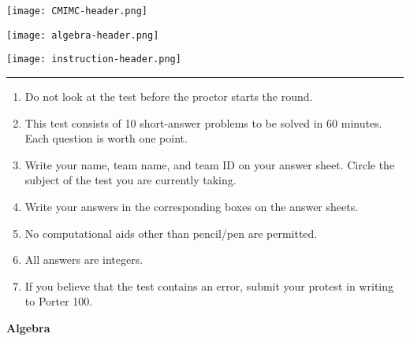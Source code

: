 \documentclass[10pt]{article}
\begin{document}
\thispagestyle{empty}
\begin{center}

\vspace*{90pt}

\texttt{[image: CMIMC-header.png]}

\texttt{[image: algebra-header.png]}

\vspace{1.6in}

\texttt{[image: instruction-header.png]}
\noindent\rule{17.7cm}{2pt}
\end{center}

\vspace{10pt}

\begin{enumerate}
\large
\item Do not look at the test before the proctor starts the round.

\item This test consists of 10 short-answer problems to be solved in 60 minutes.
	Each question is worth one point.

\item Write your name, team name, and team ID on your answer sheet. Circle the
	subject of the test you are currently taking.

\item Write your answers in the corresponding boxes on the answer sheets.

\item No computational aids other than pencil/pen are permitted.

\item All answers are integers.

\item If you believe that the test contains an error, submit your protest in writing to Porter 100.
\end{enumerate}
\newpage

\begin{center}
\huge\textbf{Algebra}\normalsize

\vspace{3pt}
\end{center}
\end{document}
